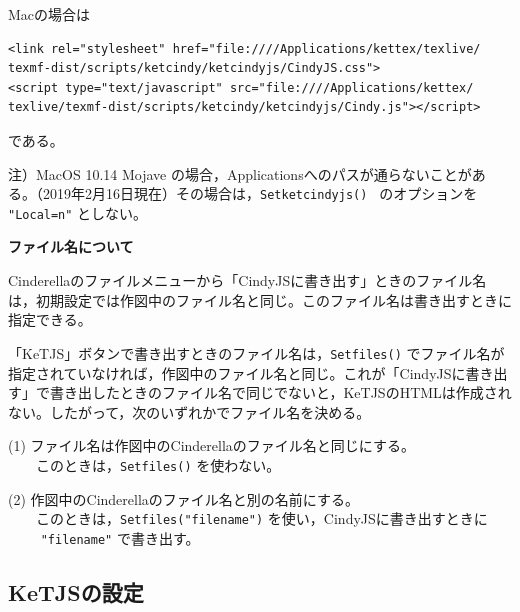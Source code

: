 \documentclass[papersize,a4paper,12pt,uplatex]{jsarticle}
\begin{document}
Macの場合は

\begin{verbatim}
<link rel="stylesheet" href="file:////Applications/kettex/texlive/
texmf-dist/scripts/ketcindy/ketcindyjs/CindyJS.css">
<script type="text/javascript" src="file:////Applications/kettex/
texlive/texmf-dist/scripts/ketcindy/ketcindyjs/Cindy.js"></script>
\end{verbatim}

である。

注）MacOS 10.14 Mojave の場合，Applicationsへのパスが通らないことがある。（2019年2月16日現在）その場合は，\verb|Setketcindyjs() | のオプションを \verb|"Local=n"| としない。

\vspace{\baselineskip}
{\bf ファイル名について}

Cinderellaのファイルメニューから「CindyJSに書き出す」ときのファイル名は，初期設定では作図中のファイル名と同じ。このファイル名は書き出すときに指定できる。

「KeTJS」ボタンで書き出すときのファイル名は，\verb|Setfiles()| でファイル名が指定されていなければ，作図中のファイル名と同じ。これが「CindyJSに書き出す」で書き出したときのファイル名で同じでないと，KeTJSのHTMLは作成されない。したがって，次のいずれかでファイル名を決める。

(1) ファイル名は作図中のCinderellaのファイル名と同じにする。\\
　　このときは，\verb|Setfiles()| を使わない。

(2) 作図中のCinderellaのファイル名と別の名前にする。\\
　　このときは，\verb|Setfiles("filename")| を使い，CindyJSに書き出すときに\\
　　 \verb|"filename"| で書き出す。


\subsection{KeTJSの設定}
\end{document}

